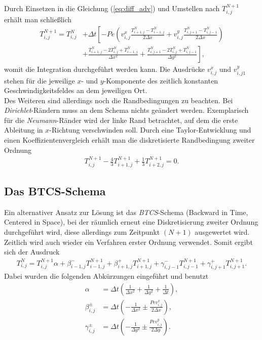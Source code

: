 \documentclass[12pt,a4paper,titlepage,headinclude,bibtotoc]{scrartcl}
\begin{document}
Durch Einsetzen in die Gleichung (\ref{eq:diff_adv}) und Umstellen nach $T_{i,j}^{N+1}$ erhält man schließlich %
\begin{align}
\label{eq:ftcs}
T_{i,j}^{N+1} = T_{i,j}^N &+ \Delta t \left[ -Pe \left( v^x_{i,j} \frac{T_{i+1,j}^N-T_{i-1,j}^N}{2\Delta x}+v^y_{i,j} \frac{T_{i,j+1}^N-T_{i,j-1}^N}{2\Delta x} \right) \right. \nonumber \\ 
 & \left.+ \frac{ T_{i+1,j}^N - 2 T_{i,j}^N +  T_{i-1,j}^N }{\Delta x^2} 
+ \frac{ T_{i,j+1}^N - 2  T_{i,j}^N + T_{i,j-1}^N}{\Delta y^2} \right],
\end{align}
womit die Integration durchgeführt werden kann. Die Ausdrücke $v^x_{i,j}$ und $v^y_{i,j1}$ stehen für die jeweilige $x$- und $y$-Komponente des zeitlich konstanten Geschwindigkeitsfeldes an dem jeweiligen Ort.\\
Des Weiteren sind allerdings noch die Randbedingungen zu beachten. Bei \textit{Dirichlet}-Rändern muss an dem Schema nichts geändert werden. Exemplarisch für die \textit{Neumann}-Ränder wird der linke Rand betrachtet, auf dem die erste Ableitung in $x$-Richtung verschwinden soll. Durch eine Taylor-Entwicklung und einen Koeffizientenvergleich erhält man die diskretisierte Randbedingung zweiter Ordnung
\begin{align*}
T_{i,j}^{N+1} - \frac{4}{3} T_{i+1,j}^{N+1} + \frac{1}{3} T_{i+2,j}^{N+1} = 0.
\end{align*}


\subsection{Das BTCS-Schema}
\label{sec:btcs}
Ein alternativer Ansatz zur Lösung ist das \textit{BTCS}-Schema (Backward in Time, Centered in Space), bei der räumlich erneut eine Diskretisierung zweiter Ordnung durchgeführt wird, diese allerdings zum Zeitpunkt $(N+1)$ ausgewertet wird. Zeitlich wird auch wieder ein Verfahren erster Ordnung verwendet.
Somit ergibt sich der Ausdruck
\begin{align}
\label{eq:impli}
T_{i,j}^{N} = T_{i,j}^{N+1} \alpha + \beta^-_{i-1,j} T_{i-1,j}^{N+1} + \beta^+_{i+1,j} T_{i+1,j}^{N+1} + \gamma^-_{i,j-1} T_{i,j-1}^{N+1} + \gamma^+_{i,j+1} T_{i,j+1}^{N+1}.
\end{align}
Dabei wurden die folgenden Abkürzungen eingeführt und benutzt
\begin{align*}
\alpha &= \Delta t \left(\frac{1}{\Delta x^2} + \frac{1}{\Delta y^2} + \frac{1}{\Delta t} \right), \\
\beta^\pm_{i,j} &= \Delta t \left(-\frac{1}{\Delta x^2} \pm \frac{Pe v^x_{i,j}}{2 \Delta x}\right), \\
\gamma^\pm_{i,j} &= \Delta t \left(-\frac{1}{\Delta y^2} \pm \frac{Pe v^y_{i,j}}{2 \Delta y}\right).
\end{align*}
\end{document}
